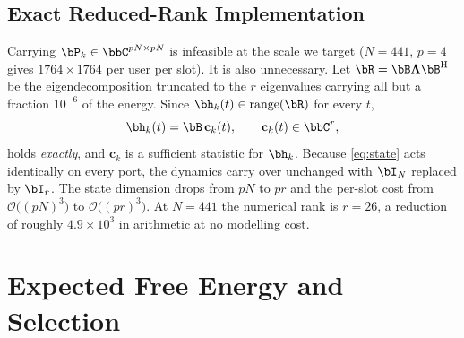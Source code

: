 \subsection{Exact Reduced-Rank Implementation}
Carrying $\bP_k\in\bbC^{pN\times pN}$ is infeasible at the scale we target
($N=441$, $p=4$ gives $1764\times1764$ per user per slot). It is also
unnecessary. Let $\bR=\bB\boldsymbol{\Lambda}\bB^{\mathrm{H}}$ be the
eigendecomposition truncated to the $r$ eigenvalues carrying all but a fraction
$10^{-6}$ of the energy. Since $\bh_k(t)\in\mathrm{range}(\bR)$ for every $t$,
\begin{equation}
  \bh_k(t) = \bB\,\mathbf{c}_k(t),
  \qquad \mathbf{c}_k(t)\in\bbC^{r},
  \label{eq:lowrank}
\end{equation}
holds \emph{exactly}, and $\mathbf{c}_k$ is a sufficient statistic for
$\bh_k$. Because \eqref{eq:state} acts identically on every port, the dynamics
carry over unchanged with $\bI_N$ replaced by $\bI_r$. The state dimension
drops from $pN$ to $pr$ and the per-slot cost from
$\mathcal{O}\big((pN)^3\big)$ to $\mathcal{O}\big((pr)^3\big)$. At $N=441$ the
numerical rank is $r=26$, a reduction of roughly $4.9\times10^{3}$ in
arithmetic at no modelling cost.

\section{Expected Free Energy and Selection}
\label{sec:efe}

